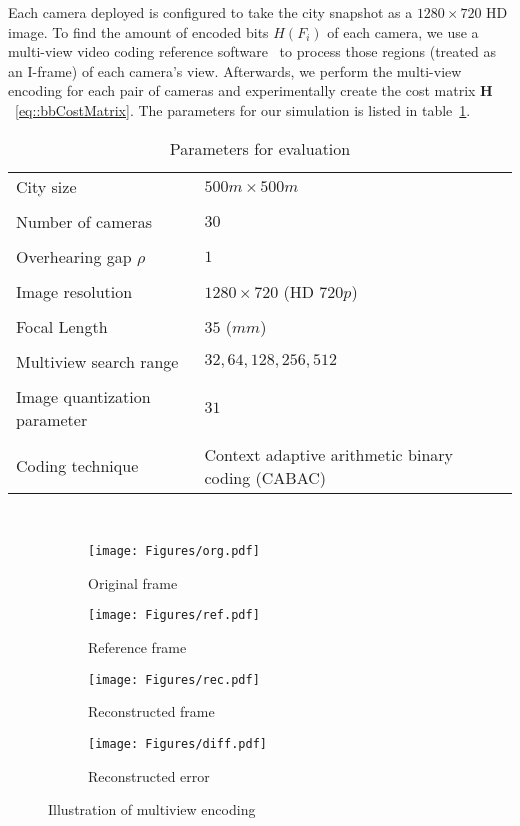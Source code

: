 Each camera deployed is configured to take the city snapshot as a $1280 \times 720$ HD image.
To find the amount of encoded bits $H(F_i)$ of each camera, we use a multi-view video coding reference software~\cite{JMVC} to process those regions (treated as an I-frame) of each camera's view.
Afterwards, we perform the multi-view encoding for each pair of cameras and experimentally create the cost matrix $\mathbf{H}$~\eqref{eq::bbCostMatrix}.
The parameters for our simulation is listed in table~\ref{tab::evaParameters}.
%
\begin{table}[htb]
\footnotesize
\centering
\begin{tabularx}{0.9\columnwidth}{X|X}
  \hline
  City size & $500m \times 500m$ \\ \\
  Number of cameras & $30$ \\ \\
  Overhearing gap $\rho$ & $1$ \\ \\
  Image resolution & $1280 \times 720$ (HD $720p$) \\ \\
  Focal Length & $35$ ($mm$) \\ \\
  Multiview search range & $32,64,128,256,512$ \\ \\
  Image quantization parameter & $31$ \\ \\
  Coding technique & Context adaptive arithmetic binary coding (CABAC) \\
  \hline
\end{tabularx}
\\
\caption{\label{tab::evaParameters}Parameters for evaluation}
\end{table}
%
\begin{figure}
\begin{center}
\begin{subfigure}[b]{0.45\columnwidth}
\texttt{[image: Figures/org.pdf]}
\caption{Original frame}
\end{subfigure}
%
\begin{subfigure}[b]{0.45\columnwidth}
\texttt{[image: Figures/ref.pdf]}
\caption{Reference frame}
\end{subfigure}
%
\begin{subfigure}[b]{0.45\columnwidth}
\texttt{[image: Figures/rec.pdf]}
\caption{Reconstructed frame}
\end{subfigure}
%
\begin{subfigure}[b]{0.45\columnwidth}
\texttt{[image: Figures/diff.pdf]}
\caption{Reconstructed error}
\end{subfigure}
%
\caption{\label{fig::multiViewImageDemo} Illustration of multiview encoding}
\end{center}
\end{figure}
%

